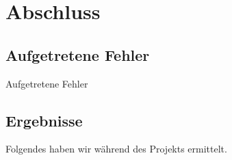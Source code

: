\section{Abschluss}

\subsection{Aufgetretene Fehler}
Aufgetretene Fehler
\subsection{Ergebnisse}%
Folgendes haben wir während des Projekts ermittelt.%